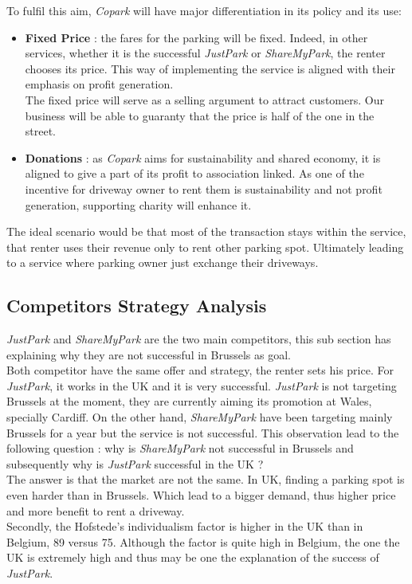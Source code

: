 \documentclass[12pt,a4paper,oneside]{book}
\newcommand{\bp}{\textit{Copark }}
\begin{document}
To fulfil this aim, \bp will have major differentiation in its policy and its use:
\begin{itemize}
\item \textbf{Fixed Price} : the fares for the parking will be fixed. Indeed, in other services, whether it is  the successful \textit{JustPark} or \textit{ShareMyPark}, the renter chooses its price. This way of implementing the service is aligned with their emphasis on profit generation.\\
The fixed price will serve as a selling argument to attract customers. Our business will be able to guaranty that the price is half of the one in the street.
\item \textbf{Donations} : as \bp aims for sustainability and shared economy, it is aligned to give a part of its profit to association linked. As one of the incentive for driveway owner to rent them is sustainability and not profit generation, supporting charity will enhance it.
\end{itemize}

The ideal scenario would be that most of the transaction stays within the service, that renter uses their revenue only to rent other parking spot. Ultimately leading to a service where parking owner just exchange their driveways.

\subsection{Competitors Strategy Analysis}

\textit{JustPark} and \textit{ShareMyPark} are the two main competitors, this sub section has explaining why they are not successful in Brussels as goal.\\

Both competitor have the same offer and strategy, the renter sets his price. For \textit{JustPark}, it works in the UK and it is very successful. \textit{JustPark} is not targeting Brussels at the moment, they are currently aiming its promotion at Wales, specially Cardiff. On the other hand, \textit{ShareMyPark} have been targeting mainly Brussels for a year but the service is not successful. This observation lead to the following question : why is \textit{ShareMyPark} not successful in Brussels and subsequently why is \textit{JustPark} successful in the UK ?\\

The answer is that the market are not the same. In UK, finding a parking spot is even harder than in Brussels.\cite{londonpark} Which lead to a bigger demand, thus higher price and more benefit to rent a driveway.\\
Secondly, the Hofstede's individualism factor is higher in the UK than in Belgium, 89 versus 75.\cite{hukbe} Although the factor is quite high in Belgium, the one the UK is extremely high and thus may be one the explanation of the success of \textit{JustPark}.\\
\end{document}
